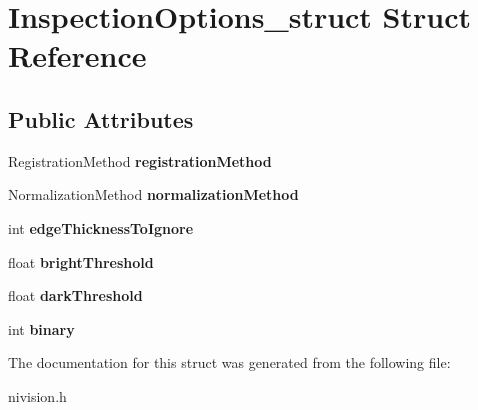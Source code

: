 \hypertarget{structInspectionOptions__struct}{\section{\-Inspection\-Options\-\_\-struct \-Struct \-Reference}
\label{structInspectionOptions__struct}
}
\subsection*{\-Public \-Attributes}
\begin{DoxyCompactItemize}
\item 
\hypertarget{structInspectionOptions__struct_a6d23253e103310af3ef4d8cda9a1f68c}{\-Registration\-Method {\bfseries registration\-Method}}\label{structInspectionOptions__struct_a6d23253e103310af3ef4d8cda9a1f68c}

\item 
\hypertarget{structInspectionOptions__struct_a10dbab7572da4e0d0b3653ac326dcb9d}{\-Normalization\-Method {\bfseries normalization\-Method}}\label{structInspectionOptions__struct_a10dbab7572da4e0d0b3653ac326dcb9d}

\item 
\hypertarget{structInspectionOptions__struct_ad5b031c4adca84ba964a8918935a1cec}{int {\bfseries edge\-Thickness\-To\-Ignore}}\label{structInspectionOptions__struct_ad5b031c4adca84ba964a8918935a1cec}

\item 
\hypertarget{structInspectionOptions__struct_a3d8797809fc4d0c19ecf966722432b84}{float {\bfseries bright\-Threshold}}\label{structInspectionOptions__struct_a3d8797809fc4d0c19ecf966722432b84}

\item 
\hypertarget{structInspectionOptions__struct_a39040a70b2647d928409aeda2a306d5c}{float {\bfseries dark\-Threshold}}\label{structInspectionOptions__struct_a39040a70b2647d928409aeda2a306d5c}

\item 
\hypertarget{structInspectionOptions__struct_aff4b8d8ae70c598bdb7d9dbc6f42b27c}{int {\bfseries binary}}\label{structInspectionOptions__struct_aff4b8d8ae70c598bdb7d9dbc6f42b27c}

\end{DoxyCompactItemize}


\-The documentation for this struct was generated from the following file\-:\begin{DoxyCompactItemize}
\item 
nivision.\-h\end{DoxyCompactItemize}
